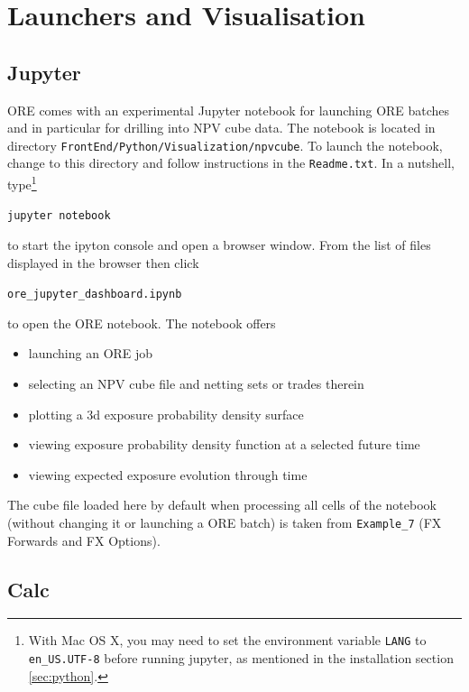 \documentclass[12pt, a4paper]{article}
\begin{document}
\clearpage
\section{Launchers and Visualisation}\label{sec:visualisation}

\subsection{Jupyter}\label{sec:jupyter}

ORE comes with an experimental Jupyter notebook for launching ORE batches and in particular for drilling into NPV cube
data.  The notebook is located in directory {\tt FrontEnd/Python/Visualization/npvcube}. To launch the notebook, change
to this directory and follow instructions in the {\tt Readme.txt}. In a nutshell, type\footnote{With Mac OS X, you may
  need to set the environment variable {\tt LANG} to {\tt en\_US.UTF-8} before running jupyter, as mentioned in the
  installation section \ref{sec:python}.}

\medskip
\centerline{\tt jupyter notebook}
\medskip

to start the ipyton console and open a browser window. From the list of files displayed in the browser then click

\medskip
\centerline{\tt ore\_jupyter\_dashboard.ipynb} 
\medskip

to open the ORE notebook. The notebook offers
\begin{itemize}
\item launching an ORE job
\item selecting an NPV cube file and netting sets or trades therein
\item plotting a 3d exposure probability density surface
\item viewing exposure probability density function at a selected future time
\item viewing expected exposure evolution through time  
\end{itemize}

The cube file loaded here by default when processing all cells of the notebook (without changing it or launching a ORE
batch) is taken from {\tt Example\_7} (FX Forwards and FX Options).


\subsection{Calc}\label{sec:calc}
\end{document}
